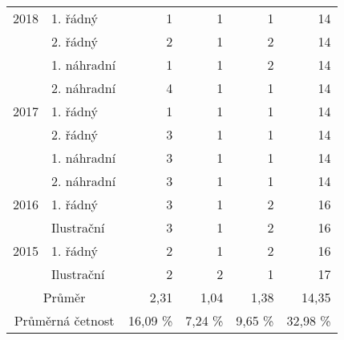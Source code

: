 \begin{table}[p]
\begin{center}
\begin{tabular}{|l|l|r|r|r|r|}
            \multicolumn{ 1}{|c|}{2018} & 1. řádný    & 1 & 1 & 1 & 14 \\ \cline{ 2- 6}
            \multicolumn{ 1}{|l|}{}     & 2. řádný    & 2 & 1 & 2 & 14 \\ \cline{ 2- 6}
            \multicolumn{ 1}{|l|}{}     & 1. náhradní & 1 & 1 & 2 & 14 \\ \cline{ 2- 6}
            \multicolumn{ 1}{|l|}{}     & 2. náhradní & 4 & 1 & 1 & 14 \\ \hline
            \multicolumn{ 1}{|c|}{2017} & 1. řádný    & 1 & 1 & 1 & 14 \\ \cline{ 2- 6}
            \multicolumn{ 1}{|l|}{}     & 2. řádný    & 3 & 1 & 1 & 14 \\ \cline{ 2- 6}
            \multicolumn{ 1}{|l|}{}     & 1. náhradní & 3 & 1 & 1 & 14 \\ \cline{ 2- 6}
            \multicolumn{ 1}{|l|}{}     & 2. náhradní & 3 & 1 & 1 & 14 \\ \hline
            \multicolumn{ 1}{|c|}{2016} & 1. řádný    & 3 & 1 & 2 & 16 \\ \cline{ 2- 6}
            \multicolumn{ 1}{|l|}{}     & Ilustrační  & 3 & 1 & 2 & 16 \\ \hline
            \multicolumn{ 1}{|c|}{2015} & 1. řádný    & 2 & 1 & 2 & 16 \\ \cline{ 2- 6}
            \multicolumn{ 1}{|l|}{}     & Ilustrační  & 2 & 2 & 1 & 17 \\ \hline
            \multicolumn{ 2}{|c|}{Průměr} & 2,31 & 1,04 & 1,38 & 14,35 \\ \hline
            \multicolumn{ 2}{|c|}{Průměrná četnost} & 16,09 \% & 7,24 \% & 9,65 \% & 32,98 \% \\ \hline
        \end{tabular}
    \end{center}
    \label{tab:8ulo}
\end{table}

